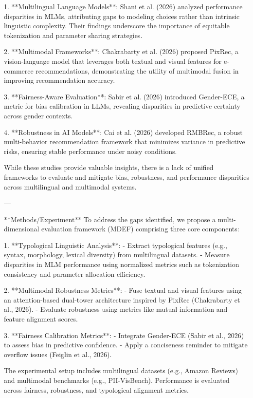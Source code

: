 1. **Multilingual Language Models**: Shani et al. (2026) analyzed performance disparities in MLMs, attributing gaps to modeling choices rather than intrinsic linguistic complexity. Their findings underscore the importance of equitable tokenization and parameter sharing strategies.  

2. **Multimodal Frameworks**: Chakrabarty et al. (2026) proposed PixRec, a vision-language model that leverages both textual and visual features for e-commerce recommendations, demonstrating the utility of multimodal fusion in improving recommendation accuracy.  

3. **Fairness-Aware Evaluation**: Sabir et al. (2026) introduced Gender-ECE, a metric for bias calibration in LLMs, revealing disparities in predictive certainty across gender contexts.  

4. **Robustness in AI Models**: Cai et al. (2026) developed RMBRec, a robust multi-behavior recommendation framework that minimizes variance in predictive risks, ensuring stable performance under noisy conditions.  

While these studies provide valuable insights, there is a lack of unified frameworks to evaluate and mitigate bias, robustness, and performance disparities across multilingual and multimodal systems.  

---

**Methods/Experiment**  
To address the gaps identified, we propose a multi-dimensional evaluation framework (MDEF) comprising three core components:  

1. **Typological Linguistic Analysis**:  
   - Extract typological features (e.g., syntax, morphology, lexical diversity) from multilingual datasets.  
   - Measure disparities in MLM performance using normalized metrics such as tokenization consistency and parameter allocation efficiency.  

2. **Multimodal Robustness Metrics**:  
   - Fuse textual and visual features using an attention-based dual-tower architecture inspired by PixRec (Chakrabarty et al., 2026).  
   - Evaluate robustness using metrics like mutual information and feature alignment scores.  

3. **Fairness Calibration Metrics**:  
   - Integrate Gender-ECE (Sabir et al., 2026) to assess bias in predictive confidence.  
   - Apply a conciseness reminder to mitigate overflow issues (Feiglin et al., 2026).  

The experimental setup includes multilingual datasets (e.g., Amazon Reviews) and multimodal benchmarks (e.g., PII-VisBench). Performance is evaluated across fairness, robustness, and typological alignment metrics.  

